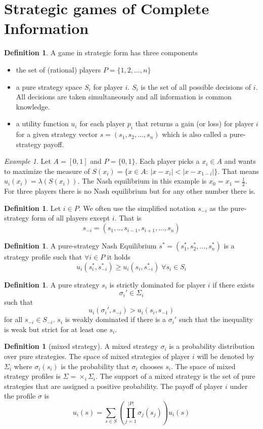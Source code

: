 \documentclass[a4paper, 12pt]{article}
\theoremstyle{plain}
\theoremstyle{definition}
\newtheorem{definition}[theorem]{Definition} %
\theoremstyle{lemma}
\theoremstyle{remark}
\theoremstyle{corollary}
\theoremstyle{example}
\newtheorem{example}[theorem]{Example}
\begin{document}
	\section{Strategic games of Complete Information}
	\begin{definition}
		A game in strategic form has three components
		\begin{itemize}
			\item the set of (rational) players $P = \{1,2,...,n\}$
			\item a pure strategy space $S_i$ for player $i$. $S_i$ is the set of all possible decisions of $i$. All decisions are taken simultaneously and all information is common knowledge.
			\item a utility function $u_i$ for each player $p_i$ that returns a gain (or loss) for player $i$ for a given strategy vector $s = (s_1,s_2,...,s_n)$ which is also called a pure-strategy payoff.
		\end{itemize}
	\end{definition}
	\begin{example}
		Let $A = [0,1]$  and $P = \{0,1\}$. Each player picks a $x_i \in A$ and wants to maximize the measure of $S(x_i) = \{x \in A: \, \left|x-x_i\right| < \left|x-x_{1-i}\right|\}$. That means $u_i(x_i) = \lambda(S(x_i))$. The Nash equilibrium in this example is $x_0=x_1=\frac{1}{2}$. For three players there is no Nash equilibrium but for any other number there is.
	\end{example}
	\begin{definition}
		Let $i \in P$. We often use the simplified notation $s_{-i}$ as the pure-strategy form of all players except $i$. That is \[s_{-i} = (s_1,..,s_{i-1},s_{i+1},...,s_n)\]
	\end{definition}
	\begin{definition}
		A pure-strategy Nash Equilibrium $s^* = (s_1^*,s_2^*,...,s_n^*)$ is a strategy profile such that $\forall i \in P$ it holds \[u_i(s_i^*,s_{-i}^*) \geq u_i(s_i,s_{-i}^*) \; \forall s_i \in S_i\]
	\end{definition}
	\begin{definition}
		A pure strategy $s_i$ is strictly dominated for player $i$ if there exists \[\sigma_i' \in \Sigma_i\] such that \[u_i(\sigma_i',s_{-i}) > u_i(s_i,s_{-1})\] for all $s_{-i} \in S_{-i}$. $s_i$ is weakly dominated if there is a $\sigma_i'$ such that the inequality is weak but strict for at least one $s_i$.
	\end{definition}
	\begin{definition}[mixed strategy]
		A mixed strategy $\sigma_i$ is a probability distribution over pure strategies. The space of mixed strategies of player $i$ will be denoted by $\Sigma_i$ where $\sigma_i(s_i)$ is the probability that $\sigma_i$ chooses $s_i$. The space of mixed strategy profiles is $\Sigma = \times_i \Sigma_i$. The support of a mixed strategy is the set of pure strategies that are assigned a positive probability. The payoff of player $i$ under the profile $\sigma$ is \[u_i(s) = \sum_{s \in S} \left(\prod_{j=1}^{\left|P\right|} \sigma_j(s_j)\right)u_i(s)\]
	\end{definition}
\end{document}
